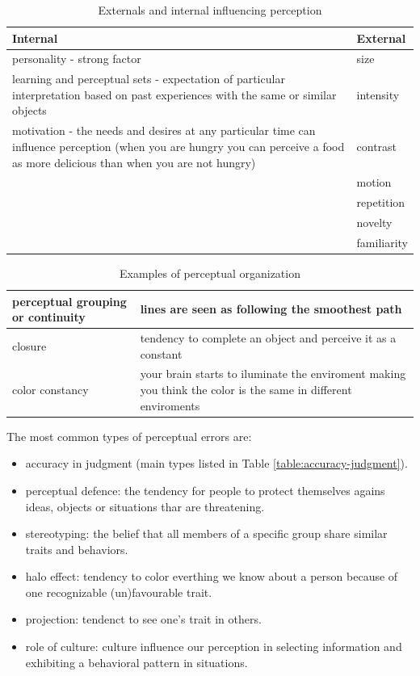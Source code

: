 \documentclass[12pt,article,oneside,a4paper]{memoir}
\begin{document}
\begin{table}
  \begin{tabular}{ p{13cm} |  p{2cm} }
    \hline
    Internal & External \\ \hline
    personality -  strong factor & size \\ \hline
    learning and perceptual sets - expectation of particular interpretation based on past experiences with the same or similar objects & intensity \\ \hline
    motivation - the needs and desires at any particular time can influence perception (when you are hungry you can perceive a food as more delicious than when you are not hungry) & contrast \\ \hline
	 & motion \\ \hline
 	 & repetition \\ \hline
 	 & novelty \\ \hline
     & familiarity \\
    \hline
  \end{tabular}
  \caption{Externals and internal influencing perception}
  \label{table:factors-perception}
\end{table}

\begin{table}
  \begin{tabular}{ l |  p{10cm} }
    \hline
    perceptual grouping or continuity & lines are seen as following the smoothest path \\ \hline
    closure & tendency to complete an object and perceive it as a constant \\ \hline
    color constancy & your brain starts to iluminate the enviroment making you think the color is the same in different enviroments \\
    \hline
  \end{tabular}
  \caption{Examples of perceptual organization}
  \label{table:perceptual-organization}
\end{table}

The most common types of perceptual errors are:
\begin{itemize}
\item accuracy in judgment (main types listed in Table \ref{table:accuracy-judgment}).
\item perceptual defence: the tendency for people to protect themselves agains ideas, objects or situations thar are threatening.
\item stereotyping: the belief that all members of a specific group share similar traits and behaviors.
\item halo effect: tendency to color everthing we know about a person because of one recognizable (un)favourable trait.
\item projection: tendenct to see one's trait in others.
\item role of culture: culture influence our perception in selecting information and exhibiting a behavioral pattern in situations.
\end{itemize}
\end{document}
